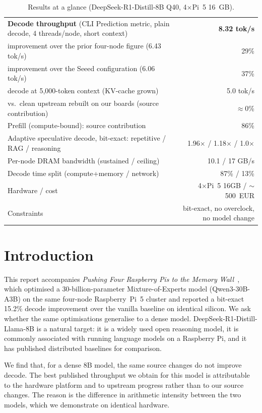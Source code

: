 \documentclass[10pt,a4paper]{article}
\begin{document}
\begin{table}[h]
\centering\small
\caption{Results at a glance (DeepSeek-R1-Distill-8B Q40, 4$\times$Pi~5 16~GB).}
\begin{tabularx}{\textwidth}{@{}Xr@{}}
\toprule
\textbf{Decode throughput} (CLI Prediction metric, plain decode, 4 threads/node, short context) & \textbf{8.32 tok/s} \\
\quad improvement over the prior four-node figure (6.43 tok/s) & 29\% \\
\quad improvement over the Seeed configuration (6.06 tok/s) & 37\% \\
\quad decode at 5{,}000-token context (KV-cache grown) & 5.0 tok/s \\
\quad vs.\ clean upstream rebuilt on our boards (source contribution) & $\approx$0\% \\
Prefill (compute-bound): source contribution & 86\% \\
Adaptive speculative decode, bit-exact: repetitive / RAG / reasoning & 1.96$\times$ / 1.18$\times$ / 1.0$\times$ \\
Per-node DRAM bandwidth (sustained / ceiling) & 10.1 / 17 GB/s \\
Decode time split (compute+memory / network) & 87\% / 13\% \\
Hardware / cost & 4$\times$Pi~5 16GB / $\sim$500~EUR \\
Constraints & bit-exact, no overclock, no model change \\
\bottomrule
\end{tabularx}
\end{table}

\section{Introduction}
This report accompanies \emph{Pushing Four Raspberry Pis to the Memory Wall}~\citep{correa2026moe}, which optimised a 30-billion-parameter Mixture-of-Experts model (Qwen3-30B-A3B) on the same four-node Raspberry~Pi~5 cluster and reported a bit-exact 15.2\% decode improvement over the vanilla baseline on identical silicon. We ask whether the same optimisations generalise to a dense model. DeepSeek-R1-Distill-Llama-8B is a natural target: it is a widely used open reasoning model, it is commonly associated with running language models on a Raspberry Pi, and it has published distributed baselines for comparison.

We find that, for a dense 8B model, the same source changes do not improve decode. The best published throughput we obtain for this model is attributable to the hardware platform and to upstream progress rather than to our source changes. The reason is the difference in arithmetic intensity between the two models, which we demonstrate on identical hardware.
\end{document}
